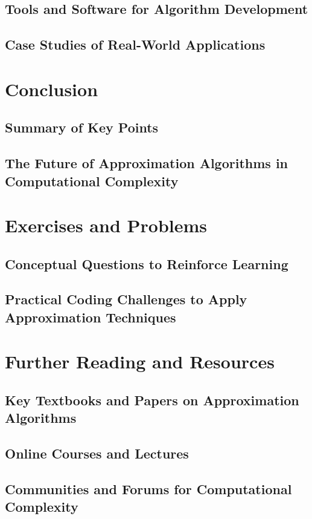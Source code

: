 \documentclass[12pt]{book} %
\begin{document}
\subsection{Tools and Software for Algorithm Development}
\subsection{Case Studies of Real-World Applications}

\section{Conclusion}
\subsection{Summary of Key Points}
\subsection{The Future of Approximation Algorithms in Computational Complexity}

\section{Exercises and Problems}
\subsection{Conceptual Questions to Reinforce Learning}
\subsection{Practical Coding Challenges to Apply Approximation Techniques}

\section{Further Reading and Resources}
\subsection{Key Textbooks and Papers on Approximation Algorithms}
\subsection{Online Courses and Lectures}
\subsection{Communities and Forums for Computational Complexity}
\end{document}
